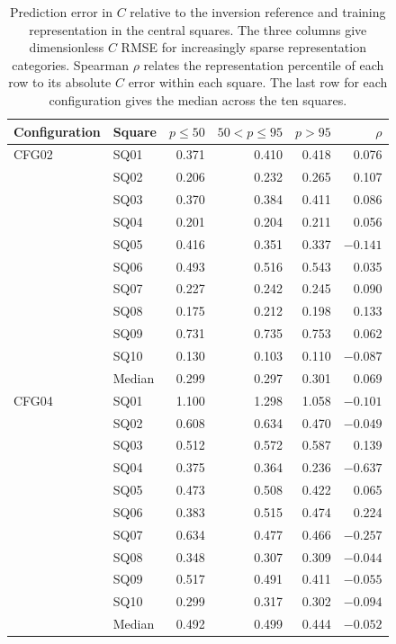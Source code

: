 \documentclass[review,jog]{igs}
\providecommand{\toprule}{\hline}
\providecommand{\midrule}{\hline}
\providecommand{\bottomrule}{\hline}
\begin{document}
\begin{table}
\centering\small
\caption{Prediction error in $C$ relative to the inversion reference and training representation in the central squares. The three columns give dimensionless $C$ RMSE for increasingly sparse representation categories. Spearman $\rho$ relates the representation percentile of each row to its absolute $C$ error within each square. The last row for each configuration gives the median across the ten squares.}
\label{tab:representation_c}
\begin{tabular}{llrrrr}
\toprule
Configuration & Square & $p\leq50$ & $50<p\leq95$ & $p>95$ & $\rho$\\
\midrule
CFG02 & SQ01 & 0.371 & 0.410 & 0.418 & 0.076\\
 & SQ02 & 0.206 & 0.232 & 0.265 & 0.107\\
 & SQ03 & 0.370 & 0.384 & 0.411 & 0.086\\
 & SQ04 & 0.201 & 0.204 & 0.211 & 0.056\\
 & SQ05 & 0.416 & 0.351 & 0.337 & $-0.141$\\
 & SQ06 & 0.493 & 0.516 & 0.543 & 0.035\\
 & SQ07 & 0.227 & 0.242 & 0.245 & 0.090\\
 & SQ08 & 0.175 & 0.212 & 0.198 & 0.133\\
 & SQ09 & 0.731 & 0.735 & 0.753 & 0.062\\
 & SQ10 & 0.130 & 0.103 & 0.110 & $-0.087$\\
 & Median & 0.299 & 0.297 & 0.301 & 0.069\\
\midrule
CFG04 & SQ01 & 1.100 & 1.298 & 1.058 & $-0.101$\\
 & SQ02 & 0.608 & 0.634 & 0.470 & $-0.049$\\
 & SQ03 & 0.512 & 0.572 & 0.587 & 0.139\\
 & SQ04 & 0.375 & 0.364 & 0.236 & $-0.637$\\
 & SQ05 & 0.473 & 0.508 & 0.422 & 0.065\\
 & SQ06 & 0.383 & 0.515 & 0.474 & 0.224\\
 & SQ07 & 0.634 & 0.477 & 0.466 & $-0.257$\\
 & SQ08 & 0.348 & 0.307 & 0.309 & $-0.044$\\
 & SQ09 & 0.517 & 0.491 & 0.411 & $-0.055$\\
 & SQ10 & 0.299 & 0.317 & 0.302 & $-0.094$\\
 & Median & 0.492 & 0.499 & 0.444 & $-0.052$\\
\bottomrule
\end{tabular}
\end{table}
\end{document}

